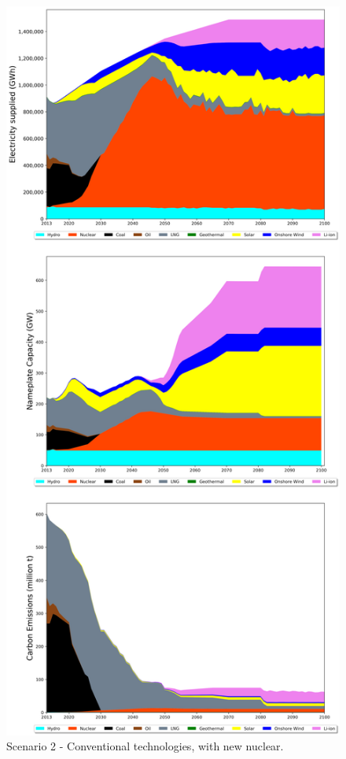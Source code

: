 \begin{figure}[H] 
\centering
\vspace*{-3cm}
\includegraphics[scale=0.42]{figures/conv_nuc}
\caption{Scenario 2 - Conventional technologies, with new nuclear.}
\label{scen2}
\end{figure}

